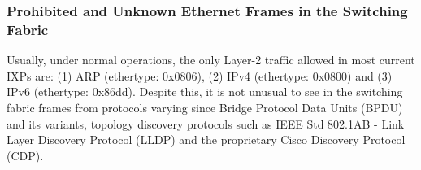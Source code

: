 \documentclass[12pt]{article}
\begin{document}


\subsubsection{Prohibited and Unknown Ethernet Frames in the Switching Fabric}

Usually, under normal operations, the only Layer-2 traffic allowed in most current IXPs are: (1) ARP (ethertype: 0x0806), (2) IPv4 (ethertype: 0x0800) and (3) IPv6 (ethertype: 0x86dd). Despite this, it is not unusual to see in the switching fabric frames from protocols varying since Bridge Protocol Data Units (BPDU) and its variants, topology discovery protocols such as IEEE Std 802.1AB - Link Layer Discovery Protocol (LLDP) and the proprietary Cisco Discovery Protocol (CDP). 

\end{document}
